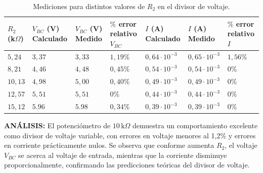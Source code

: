 \documentclass[12pt,a4paper]{article}
\begin{document}
\bigskip
\begin{table}[H]
    \centering
    \fontsize{10pt}{12pt}\selectfont
    \renewcommand{\arraystretch}{1.2}
    \setlength{\tabcolsep}{6pt}
    {
    \begin{tabular}{|C{1cm}|C{1.8cm}|C{1.8cm}|C{1.8cm}|C{2cm}|C{1.8cm}|C{2cm}|}
    \hline
    \textbf{$R_2$ (k$\Omega$)} &
    \textbf{$V_{BC}$ (V) Calculado} &
    \textbf{$V_{BC}$ (V) Medido} &
    \textbf{$\%$ error relativo $V_{BC}$} &
    \textbf{$I$ (A) Calculado} &
    \textbf{$I$ (A) Medido} &
    \textbf{$\%$ error relativo $I$} \\
    \hline
    $5,24$ & $3,37$ & $3,33$ & $1,19\%$ & $0,64\cdot10^{-3}$ & $0,65\cdot10^{-3}$ & $1,56\%$ \\
    \hline
    $8,21$ & $4,46$ & $4,48$ & $0,45\%$ & $0,54\cdot10^{-3}$ & $0,54\cdot10^{-3}$ & $0\%$ \\
    \hline
    $10,13$ & $4,98$ & $5,00$ & $0,40\%$ & $0,49\cdot10^{-3}$ & $0,49\cdot10^{-3}$ & $0\%$ \\
    \hline
    $12,57$ & $5,51$ & $5,51$ & $0\%$ & $0,44\cdot10^{-3}$ & $0,44\cdot10^{-3}$ & $0\%$ \\
    \hline
    $15,12$ & $5.96$ & $5.98$ & $0,34\%$ & $0,39\cdot10^{-3}$ & $0,39\cdot10^{-3}$ & $0\%$ \\
    \hline
    \end{tabular}}
\caption{Mediciones para distintos valores de $R_2$ en el divisor de voltaje.}
\label{tab:divisor-voltaje-potenciometro10k}
\end{table}

\textbf{ANÁLISIS:} El potenciómetro de $10\,\mathrm{k}\Omega$ demuestra un comportamiento excelente como divisor de voltaje variable, con errores en voltaje menores al 1,2\% y errores en corriente prácticamente nulos. Se observa que conforme aumenta $R_2$, el voltaje $V_{BC}$ se acerca al voltaje de entrada, mientras que la corriente disminuye proporcionalmente, confirmando las predicciones teóricas del divisor de voltaje.
\bigskip
\end{document}
